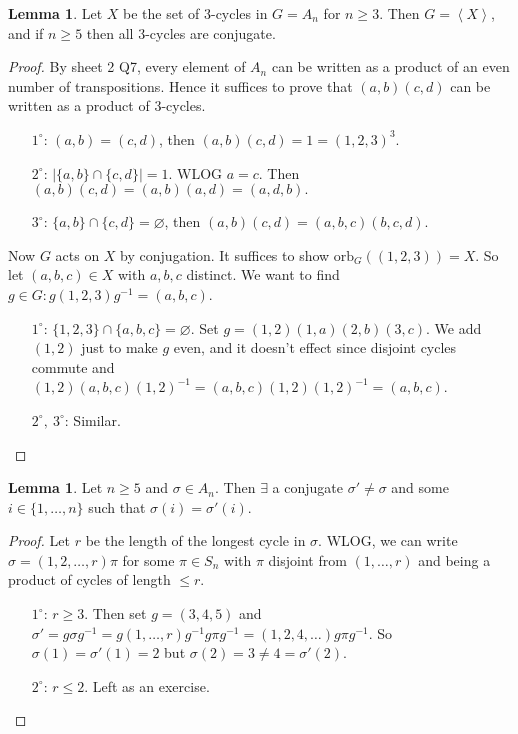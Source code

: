 \documentclass[a4paper]{article}
\newcommand{\la}{\left\langle}
\newcommand{\ra}{\right\rangle}
\newcommand{\orb}{\text{orb}}
\theoremstyle{definition}
\newtheorem{lemma}[defn]{Lemma}
\begin{document}
\begin{lemma}
\label{lemma:3cyclesgenAn}
Let $X$ be the set of 3-cycles in $G=A_n$ for $n\geq 3$. Then $G=\la X\ra$, and if $n\geq 5$ then all 3-cycles are conjugate.
\end{lemma}
\begin{proof}
By sheet 2 Q7, every element of $A_n$ can be written as a product of an even number of transpositions. Hence it suffices to prove that $(a,b)(c,d)$ can be written as a product of 3-cycles.
\begin{enumerate}
\item[$1^\circ$:] $(a,b)=(c,d)$, then $(a,b)(c,d)=1=(1,2,3)^3$.
\item[$2^\circ$:] $|\{a,b\}\cap \{c,d\}|=1$. WLOG $a=c$. Then $(a,b)(c,d)=(a,b)(a,d)=(a,d,b).$
\item[$3^\circ$:] $\{a,b\}\cap \{c,d\}=\varnothing$, then $(a,b)(c,d)=(a,b,c)(b,c,d).$
\end{enumerate}

Now $G$ acts on $X$ by conjugation. It suffices to show $\orb_G((1,2,3))=X$. So let $(a,b,c)\in X$ with $a,b,c$ distinct. We want to find $g\in G:g(1,2,3)g^{-1}=(a,b,c)$.
\begin{enumerate}
\item[$1^\circ$:] $\{1,2,3\}\cap \{a,b,c\}=\varnothing$. Set $g=(1,2)(1,a)(2,b)(3,c)$. We add $(1,2)$ just to make $g$ even, and it doesn't effect since disjoint cycles commute and $(1,2)(a,b,c)(1,2)^{-1}=(a,b,c)(1,2)(1,2)^{-1}=(a,b,c)$.
\item[$2^\circ,\ 3^\circ$:] Similar.
\end{enumerate}
\end{proof}

\begin{lemma}
Let $n\geq 5$ and $\sigma\in A_n$. Then $\exists$ a conjugate $\sigma'\neq\sigma$ and some $i\in\{1,\ldots,n\}$ such that $\sigma(i)=\sigma'(i)$.
\end{lemma}
\begin{proof}
Let $r$ be the length of the longest cycle in $\sigma$. WLOG, we can write $\sigma=(1,2,\ldots,r)\pi$ for some $\pi\in S_n$ with $\pi$ disjoint from $(1,\ldots,r)$ and being a product of cycles of length $\leq r$.
\begin{enumerate}
\item[$1^\circ$:] $r\geq 3$. Then set $g=(3,4,5)$ and $\sigma'=g\sigma g^{-1}=g(1,\ldots,r)g^{-1}g\pi g^{-1}=(1,2,4,\ldots)g\pi g^{-1}$. So $\sigma(1)=\sigma'(1)=2$ but $\sigma(2)=3\neq 4=\sigma'(2)$.
\item[$2^\circ$:] $r\leq 2$. Left as an exercise.
\end{enumerate}
\end{proof}
\end{document}
